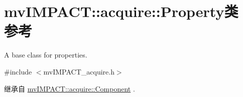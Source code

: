 \hypertarget{classmv_i_m_p_a_c_t_1_1acquire_1_1_property}{\section{mv\+I\+M\+P\+A\+C\+T\+:\+:acquire\+:\+:Property类 参考}
\label{classmv_i_m_p_a_c_t_1_1acquire_1_1_property}
}


A base class for properties.  




{\ttfamily \#include $<$mv\+I\+M\+P\+A\+C\+T\+\_\+acquire.\+h$>$}



继承自 \hyperlink{classmv_i_m_p_a_c_t_1_1acquire_1_1_component}{mv\+I\+M\+P\+A\+C\+T\+::acquire\+::\+Component} .



